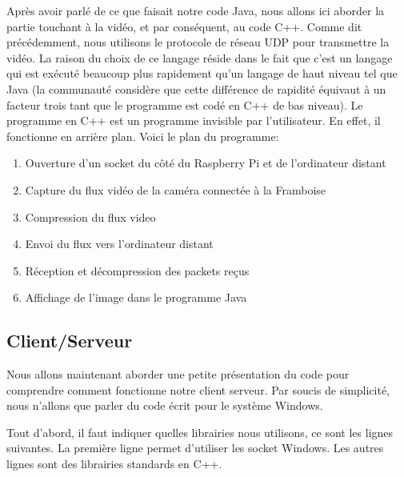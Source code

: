 \documentclass[a4paper,11pt]{report}
\begin{document}
{Après avoir parlé de ce que faisait notre code Java, nous allons ici aborder la partie touchant à la vidéo, et par conséquent, au code C++.  Comme dit précédemment, nous utilisons le protocole de réseau UDP  pour transmettre la vidéo. La raison du choix de ce langage réside dans le fait que c'est un langage qui est exécuté beaucoup plus rapidement qu'un langage de haut niveau tel que Java (la communauté considère que cette différence de rapidité équivaut à un facteur trois tant que le programme est codé en C++ de bas niveau). Le programme en C++ est un programme invisible par l'utilisateur. En effet, il fonctionne en arrière plan. Voici le plan du programme:
\begin{enumerate}
\item Ouverture d'un socket du côté du Raspberry Pi et de l'ordinateur distant
\item Capture du flux vidéo de la caméra connectée à la Framboise
\item Compression du flux video
\item Envoi du flux vers l'ordinateur distant
\item Réception et décompression des packets reçus
\item Affichage de l'image dans le programme Java
\end{enumerate}



\subsection{Client/Serveur}

Nous allons maintenant aborder une petite présentation du code pour comprendre comment fonctionne notre client serveur. Par soucis de simplicité, nous n'allons que parler du code écrit pour le système Windows. 

Tout d'abord, il faut indiquer quelles librairies nous utilisons, ce sont les lignes suivantes. La première ligne permet d'utiliser les socket Windows. Les autres lignes sont des librairies standards en C++.


}
\end{document}

